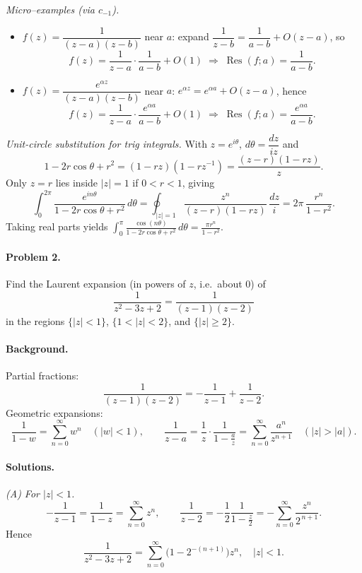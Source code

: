 \documentclass[11pt,a4paper]{article}
\theoremstyle{definition}
\theoremstyle{definition}
\theoremstyle{plain}
\theoremstyle{remark}
\DeclareMathOperator{\Res}{Res}
\begin{document}
\medskip
\emph{Micro–examples (via $c_{-1}$).}
\begin{itemize}
	\item $f(z)=\dfrac{1}{(z-a)(z-b)}$ near $a$: expand
	\(
	\dfrac{1}{z-b}=\dfrac{1}{a-b} + O(z-a)
	\),
	so
	\[
	f(z)=\frac{1}{z-a}\cdot \frac{1}{a-b} + O(1)
	\;\Rightarrow\;
	\Res(f;a)=\frac{1}{a-b}.
	\]
	\item $f(z)=\dfrac{e^{\alpha z}}{(z-a)(z-b)}$ near $a$:
	\(
	e^{\alpha z}=e^{\alpha a}+O(z-a)
	\), hence
	\[
	f(z)=\frac{1}{z-a}\cdot \frac{e^{\alpha a}}{a-b}+O(1)
	\;\Rightarrow\;
	\Res(f;a)=\frac{e^{\alpha a}}{a-b}.
	\]
\end{itemize}

\medskip
\emph{Unit-circle substitution for trig integrals.}
With $z=e^{i\theta}$, $d\theta=\dfrac{dz}{iz}$ and
\[
1-2r\cos\theta+r^2=(1-rz)(1-rz^{-1})=\frac{(z-r)(1-rz)}{z}.
\]
Only $z=r$ lies inside $|z|=1$ if $0<r<1$, giving
\[
\int_{0}^{2\pi}\frac{e^{in\theta}}{1-2r\cos\theta+r^2}\,d\theta
=\oint_{|z|=1}\frac{z^n}{(z-r)(1-rz)}\,\frac{dz}{i}
=2\pi\,\frac{r^n}{1-r^2}.
\]
Taking real parts yields
\(
\displaystyle \int_{0}^{\pi}\frac{\cos(n\theta)}{1-2r\cos\theta+r^2}\,d\theta=\frac{\pi r^n}{1-r^2}.
\)

\paragraph{Problem 2.}
Find the Laurent expansion (in powers of $z$, i.e.\ about $0$) of
\[
\frac{1}{z^{2}-3z+2}=\frac{1}{(z-1)(z-2)}
\]
in the regions $\{|z|<1\}$, $\{1<|z|<2\}$, and $\{|z|\ge 2\}$.

\paragraph{Background.}
Partial fractions:
\[
\frac{1}{(z-1)(z-2)}=-\frac{1}{z-1}+\frac{1}{z-2}.
\]
Geometric expansions:
\[
\frac{1}{1-w}=\sum_{n=0}^{\infty}w^{n}\quad(|w|<1),\qquad
\frac{1}{z-a}=\frac{1}{z}\cdot\frac{1}{1-\frac{a}{z}}
=\sum_{n=0}^{\infty}\frac{a^{n}}{z^{n+1}}\quad(|z|>|a|).
\]

\paragraph{Solutions.}

\emph{(A) For $|z|<1$.}
\[
-\frac{1}{z-1}=\frac{1}{1-z}=\sum_{n=0}^{\infty}z^{n},\qquad
\frac{1}{z-2}=-\frac{1}{2}\frac{1}{1-\frac{z}{2}}
=-\sum_{n=0}^{\infty}\frac{z^{n}}{2^{\,n+1}}.
\]
Hence
\[
\boxed{\ \frac{1}{z^{2}-3z+2}=\sum_{n=0}^{\infty}\Big(1-2^{-(n+1)}\Big)z^{n},\quad |z|<1.\ }
\]
\end{document}
